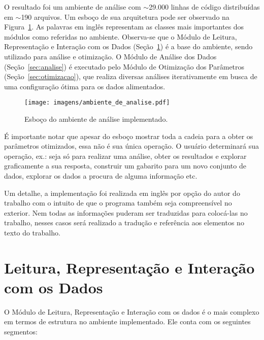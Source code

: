 O resultado foi um ambiente de análise com $\sim$29.000 linhas de
código distribuídas em $\sim$190 arquivos. Um esboço de sua
arquitetura pode ser observado na Figura~\ref{fig:ambiente_analise}.
As palavras em inglês representam as classes mais importantes dos
módulos como referidas no ambiente. Observa-se que o Módulo de
Leitura, Representação e Interação com os Dados
(Seção~\ref{sec:daq_info}) é a base do ambiente, sendo utilizado
para análise e otimização. O Módulo de Análise dos Dados
(Seção~\ref{sec:analise}) é executado pelo Módulo de Otimização dos
Parâmetros (Seção~\ref{sec:otimizacao}), que realiza diversas
análises iterativamente em busca de uma configuração ótima para os
dados alimentados.

\begin{figure}[h!t]
\centering
\texttt{[image: imagens/ambiente\_de\_analise.pdf]}
\caption{Esboço do ambiente de análise implementado.}
\label{fig:ambiente_analise}
\end{figure}

É importante notar que apesar do esboço mostrar toda a cadeia para a
obter os parâmetros otimizados, essa não é sua única operação. O
usuário determinará sua operação, ex.: seja só para realizar uma
análise, obter os resultados e explorar graficamente a sua resposta,
construir um gabarito para um novo conjunto de dados, explorar os
dados a procura de alguma informação etc.

Um detalhe, a implementação foi realizada em inglês por opção do autor
do trabalho com o intuito de que o programa também seja compreensível
no exterior. Nem todas as informações puderam ser traduzidas para
colocá-las no trabalho, nesses casos será realizado a tradução e
referência aos elementos no texto do trabalho.

\section{Leitura, Representação e Interação com os Dados}
\label{sec:daq_info}

O Módulo de Leitura, Representação e Interação com os dados é o mais
complexo em termos de estrutura no ambiente implementado. Ele conta
com os seguintes segmentos:

